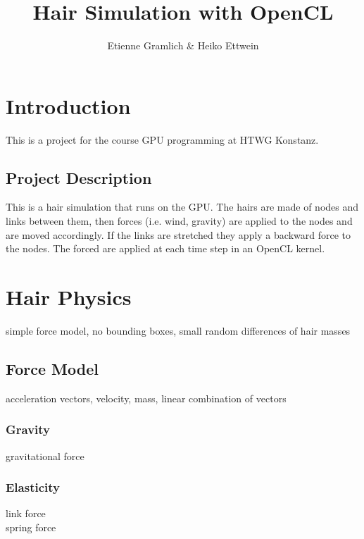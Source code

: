 \documentclass[11pt,a4paper]{scrartcl}
\title{Hair Simulation with OpenCL}
\author{Etienne Gramlich \& Heiko Ettwein}
\begin{document}
\maketitle
\tableofcontents
\newpage
{}

\section{Introduction}
This is a project for the course GPU programming at HTWG Konstanz.

\subsection{Project Description}
This is a hair simulation that runs on the GPU.
The hairs are made of nodes and links between them, then forces (i.e. wind, gravity) are applied to the nodes and are moved accordingly. If the links are stretched they apply a backward force to the nodes.
The forced are applied at each time step in an OpenCL kernel.


\section{Hair Physics}
simple force model, no bounding boxes, small random differences of hair masses

\subsection{Force Model}
acceleration vectors, velocity, mass, linear combination of vectors

\subsubsection{Gravity}
gravitational force

\subsubsection{Elasticity}
link force \\ spring force
\end{document}
